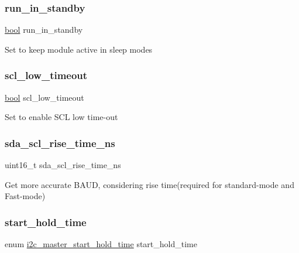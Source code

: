 \subsubsection{\texorpdfstring{run\_in\_standby}{run\_in\_standby}}
{\footnotesize\ttfamily \mbox{\hyperlink{group__group__sam0__utils_ga97a80ca1602ebf2303258971a2c938e2}{bool}} run\+\_\+in\+\_\+standby}

Set to keep module active in sleep modes \mbox{\label{structi2c__master__config_ab883785fee7f9079044bdadfe5db9bb9}} 
\subsubsection{\texorpdfstring{scl\_low\_timeout}{scl\_low\_timeout}}
{\footnotesize\ttfamily \mbox{\hyperlink{group__group__sam0__utils_ga97a80ca1602ebf2303258971a2c938e2}{bool}} scl\+\_\+low\+\_\+timeout}

Set to enable S\+CL low time-\/out \mbox{\label{structi2c__master__config_ac3462c504b169ba16990f2a14fcd7064}} 
\subsubsection{\texorpdfstring{sda\_scl\_rise\_time\_ns}{sda\_scl\_rise\_time\_ns}}
{\footnotesize\ttfamily uint16\+\_\+t sda\+\_\+scl\+\_\+rise\+\_\+time\+\_\+ns}

Get more accurate B\+A\+UD, considering rise time(required for standard-\/mode and Fast-\/mode) \mbox{\label{structi2c__master__config_a2ae2ec272b3ad065b0140b17d490f377}} 
\subsubsection{\texorpdfstring{start\_hold\_time}{start\_hold\_time}}
{\footnotesize\ttfamily enum \mbox{\hyperlink{group__asfdoc__sam0__sercom__i2c__group_gadd8aa7cabbddc1cd2c1a8753c9b99d20}{i2c\+\_\+master\+\_\+start\+\_\+hold\+\_\+time}} start\+\_\+hold\+\_\+time}

